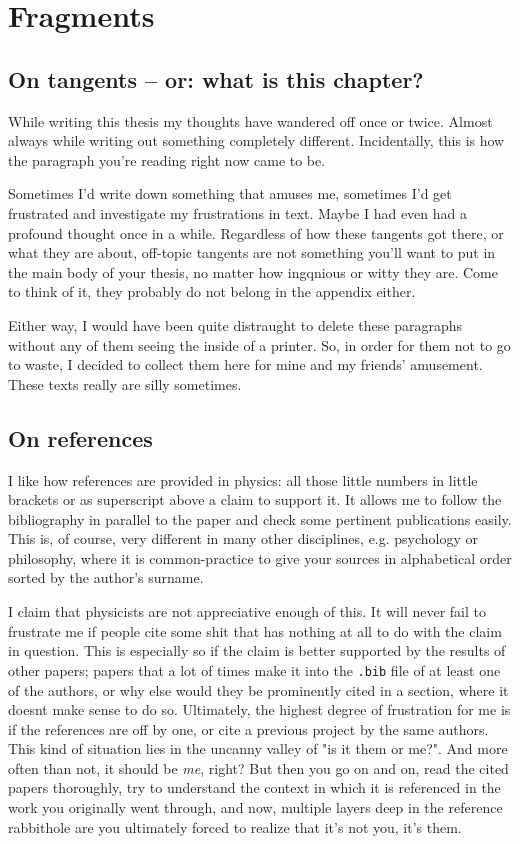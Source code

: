 \chapter{Fragments}
\label{ch:fragments}

\section*{On tangents -- or: what is this chapter?}
While writing this thesis my thoughts have wandered off once or twice. Almost
always while writing out something completely different. Incidentally, this is
how the paragraph you're reading right now came to be.

Sometimes I'd write down something that amuses me, sometimes I'd get frustrated
and investigate my frustrations in text. Maybe I had even had a profound
thought once in a while.  Regardless of how these tangents got there, or what
they are about, off-topic tangents are not something you'll want to put in the
main body of your thesis, no matter how ingqnious or witty they are.  Come to
think of it, they probably do not belong in the appendix either.

Either way, I would have been quite distraught to delete these paragraphs
without any of them seeing the inside of a printer. So, in order for them not
to go to waste, I decided to collect them here for mine and my friends'
amusement. These texts really are silly sometimes.

\section*{On references}
I like how references are provided in physics: all those little numbers in
little brackets or as superscript above a claim to support it. It allows me to
follow the bibliography in parallel to the paper and check some pertinent
publications easily. This is, of course, very different in many other
disciplines, e.g. psychology or philosophy, where it is common-practice to give
your sources in alphabetical order sorted by the author's surname.

I claim that physicists are not appreciative enough of this. It will never fail
to frustrate me if people cite some shit that has nothing at all to do with the
claim in question. This is especially so if the claim is better supported by
the results of other papers; papers that a lot of times make it into the
\texttt{.bib} file of at least one of the authors, or why else would they be
prominently cited in a section, where it doesnt make sense to do so.
Ultimately, the highest degree of frustration for me is if the references are
off by one, or cite a previous project by the same authors. This kind of
situation lies in the uncanny valley of "is it them or me?". And more often
than not, it should be \emph{me}, right? But then you go on and on, read the
cited papers thoroughly, try to understand the context in which it is
referenced in the work you originally went through, and now, multiple layers
deep in the reference rabbithole are you ultimately forced to realize that it's
not you, it's them. 

